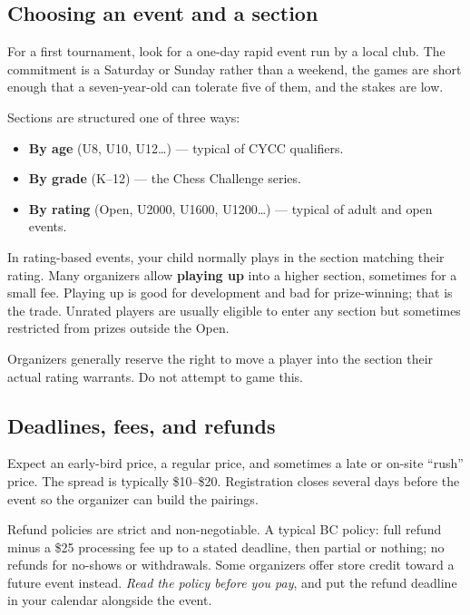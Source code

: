 \documentclass[10pt,letterpaper]{article}
\newcommand{\term}[1]{\textbf{#1}}
\begin{document}
\subsection{Choosing an event and a section}

For a first tournament, look for a one-day rapid event run by a local club. The
commitment is a Saturday or Sunday rather than a weekend, the games are short enough that
a seven-year-old can tolerate five of them, and the stakes are low.

Sections are structured one of three ways:

\begin{itemize}
  \item \textbf{By age} (U8, U10, U12\ldots) --- typical of CYCC qualifiers.
  \item \textbf{By grade} (K--12) --- the Chess Challenge series.
  \item \textbf{By rating} (Open, U2000, U1600, U1200\ldots) --- typical of
        adult and open events.
\end{itemize}

In rating-based events, your child normally plays in the section matching their
rating. Many organizers allow \term{playing up} into a higher section, sometimes
for a small fee. Playing up is good for development and bad for prize-winning;
that is the trade. Unrated players are usually eligible to enter any section but
sometimes restricted from prizes outside the Open.

Organizers generally reserve the right to move a player into the section their
actual rating warrants. Do not attempt to game this.

\subsection{Deadlines, fees, and refunds}

Expect an early-bird price, a regular price, and sometimes a late or on-site
``rush'' price. The spread is typically \$10--\$20. Registration closes several
days before the event so the organizer can build the pairings.

Refund policies are strict and non-negotiable. A typical BC policy: full refund
minus a \$25 processing fee up to a stated deadline, then partial or nothing;
no refunds for no-shows or withdrawals. Some organizers offer store credit
toward a future event instead. \emph{Read the policy before you pay}, and put
the refund deadline in your calendar alongside the event.
\end{document}
